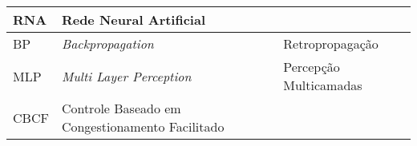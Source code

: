 \begin{table}[h!]
\begin{tabularx}{\textwidth}{l|X|X}
RNA     & Rede Neural Artificial                                                    &                                                    \\ \hline
BP      & \textit{Backpropagation}                                                  & Retropropagação                                    \\ \hline
MLP     & \textit{Multi Layer Perception}                                           & Percepção Multicamadas                             \\ \hline
CBCF    & Controle Baseado em Congestionamento Facilitado                           &                                                   
\end{tabularx}
\end{table}
\cleardoublepage

\tableofcontents*
\cleardoublepage